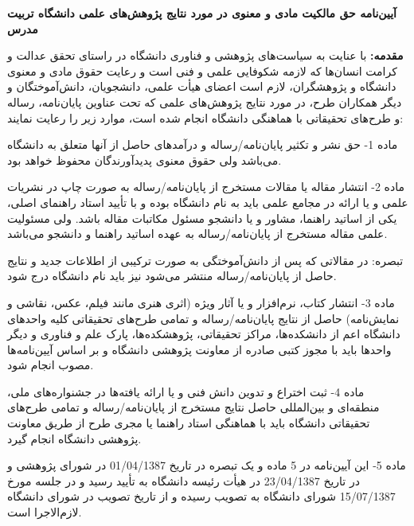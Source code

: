 %
%
%
%
%
%

\begin{center}
\textbf{
آیین‌نامه حق مالکیت مادی و معنوی در مورد نتایج پژوهش‌های علمی دانشگاه تربیت مدرس
}
\end{center}
\thispagestyle{empty}
\fontsize{3.4mm}{3.4mm}\selectfont 
\textbf{
مقدمه:
}
با عنایت به سیاست‌های پژوهشی و فناوری دانشگاه در راستای تحقق عدالت و کرامت انسان‌ها که لازمه شکوفایی علمی و فنی است و رعایت حقوق مادی و معنوی دانشگاه و پژوهشگران، لازم است اعضای هیأت علمی، دانشجویان، دانش‌آموختگان و دیگر همکاران طرح، در مورد نتایج پژوهش‌های علمی که تحت عناوین پایان‌نامه، رساله و طرح‌های تحقیقاتی با هماهنگی دانشگاه انجام شده است، موارد زیر را رعایت نمایند:

ماده 1- حق نشر و تکثیر پایان‌نامه/رساله و درآمدهای حاصل از آنها متعلق به دانشگاه می‌باشد ولی حقوق معنوی پدیدآورندگان محفوظ خواهد بود.

ماده 2- انتشار مقاله یا مقالات مستخرج از پایان‌نامه/رساله به صورت چاپ در نشریات علمی و یا ارائه در مجامع علمی باید به نام دانشگاه بوده و با تأیید استاد راهنمای اصلی، یکی از اساتید راهنما، مشاور و یا دانشجو مسئول مکاتبات مقاله باشد. ولی مسئولیت علمی مقاله مستخرج از پایان‌نامه/رساله به عهده اساتید راهنما و دانشجو می‌باشد. 

تبصره: در مقالاتی که پس از دانش‌آموختگی به صورت ترکیبی از اطلاعات جدید و نتایج حاصل از پایان‌نامه/رساله منتشر می‌شود نیز باید نام دانشگاه درج شود.

ماده 3- انتشار کتاب، نرم‌افزار و یا آثار ویژه (اثری هنری مانند فیلم، عکس، نقاشی و نمایش‌نامه) حاصل از نتایج پایان‌نامه/رساله و تمامی طرح‌های تحقیقاتی کلیه واحدهای دانشگاه اعم از دانشکده‌ها، مراکز تحقیقاتی، پژوهشکده‌ها، پارک علم و فناوری و دیگر واحدها باید با مجوز کتبی صادره از معاونت پژوهشی دانشگاه و بر اساس آیین‌نامه‌ها مصوب انجام شود.

ماده 4- ثبت اختراع و تدوین دانش فنی و یا ارائه یافته‌ها در جشنواره‌های ملی، منطقه‌ای و بین‌المللی حاصل نتایج مستخرج از پایان‌نامه/رساله و تمامی طرح‌های تحقیقاتی دانشگاه باید با هماهنگی استاد راهنما یا مجری طرح از طریق معاونت پژوهشی دانشگاه انجام گیرد.

ماده 5- این آیین‌نامه در 5 ماده و یک تبصره در تاریخ 01/04/1387 در شورای پژوهشی و در تاریخ 23/04/1387 در هیأت رئیسه دانشگاه به تأیید رسید و در جلسه مورخ 15/07/1387 شورای دانشگاه به تصویب رسیده و از تاریخ تصویب در شورای دانشگاه لازم‌الاجرا است.

